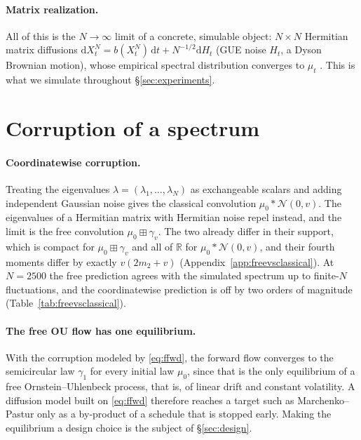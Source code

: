 \documentclass[11pt]{article}
\newcommand{\R}{\mathbb{R}}
\newcommand{\dd}{\mathrm{d}}
\theoremstyle{plain}
\theoremstyle{definition}
\theoremstyle{remark}
\begin{document}
\paragraph{Matrix realization.} All of this is the $N\to\infty$ limit of a concrete,
simulable object: $N\times N$ Hermitian matrix diffusions $\dd X^N_t = b(X^N_t)\,\dd
t + N^{-1/2}\dd H_t$ (GUE noise $H_t$, a Dyson Brownian motion), whose empirical
spectral distribution converges to $\mu_t$ \citep{Dyson1962, RogersShi1993}. This is
what we simulate throughout \S\ref{sec:experiments}.

\section{Corruption of a spectrum}\label{sec:naive}

\paragraph{Coordinatewise corruption.} Treating the eigenvalues
$\lambda=(\lambda_1,\dots,\lambda_N)$ as exchangeable scalars and adding independent Gaussian noise
gives the classical convolution $\mu_0*\mathcal N(0,v)$. The eigenvalues of a Hermitian matrix with
Hermitian noise repel instead, and the limit is the free convolution $\mu_0\boxplus\gamma_v$. The two
already differ in their support, which is compact for $\mu_0\boxplus\gamma_v$ and all of $\R$ for
$\mu_0*\mathcal N(0,v)$, and their fourth moments differ by exactly $v(2m_2+v)$
(Appendix~\ref{app:freevsclassical}). At $N=2500$ the free prediction agrees with the simulated
spectrum up to finite-$N$ fluctuations, and the coordinatewise prediction is off by two orders
of magnitude (Table~\ref{tab:freevsclassical}).

\paragraph{The free OU flow has one equilibrium.} With the corruption modeled by
\eqref{eq:ffwd}, the forward flow converges to the semicircular law $\gamma_1$ for every
initial law $\mu_0$, since that is the only equilibrium of a free Ornstein--Uhlenbeck process,
that is, of linear drift and constant volatility. A diffusion model built on \eqref{eq:ffwd}
therefore reaches a target such as Marchenko--Pastur only as a by-product of a schedule that is
stopped early. Making the equilibrium a design choice is the subject of \S\ref{sec:design}.
\end{document}
